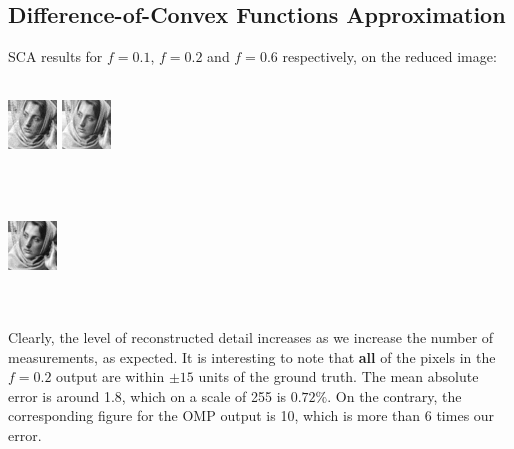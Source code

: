 \documentclass[letterpaper, 10 pt, conference]{article}
\begin{document}
\subsection{Difference-of-Convex Functions Approximation}
SCA results for $f=0.1$, $f=0.2$ and $f=0.6$ respectively, on the reduced image: \\ \\
\centerline{\includegraphics[scale=2.3]{out-sca-10p} \includegraphics[scale=2.3]{out-sca-20p}} \\ \\
\centerline{ \includegraphics[scale=2.3]{out-sca-60p}} \\ \\
Clearly, the level of reconstructed detail increases as we increase the number of measurements, as expected. It is interesting to note that \textbf{all} of the pixels in the $f=0.2$ output are within $\pm 15$ units of the ground truth. The mean absolute error is around 1.8, which on a scale of 255 is $0.72\%$. On the contrary, the corresponding figure for the OMP output is 10, which is more than 6 times our error.
\end{document}
